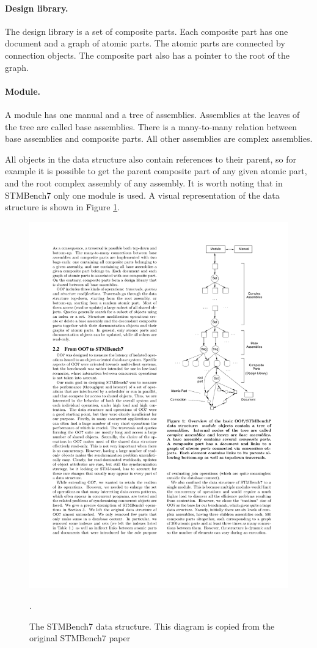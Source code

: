 \documentclass[12pt,a4paper,oneside,openright]{report}
\newcommand{\mycaption}[2]{\caption[#1]{#1 #2}}
\begin{document}
\paragraph{Design library.} The design library is a set of composite
parts. Each composite part has one document and a graph of atomic
parts. The atomic parts are connected by connection objects. The
composite part also has a pointer to the root of the graph.

\paragraph{Module.} A module has one manual and a tree of
assemblies. Assemblies at the leaves of the tree are called base
assemblies. There is a many-to-many relation between base assemblies
and composite parts. All other assemblies are complex assemblies.

All objects in the data structure also contain references to their
parent, so for example it is possible to get the parent composite part
of any given atomic part, and the root complex assembly of any
assembly. It is worth noting that in STMBench7 only one module is
used. A visual representation of the data structure is shown in Figure
\ref{fig:stmbench7}.

\begin{figure}[h]
  \centering \includegraphics{stmbench7.pdf} \mycaption{The STMBench7
    data structure.}{This diagram is copied from the original
    STMBench7 paper~\cite{STMBench7}}.
  \label{fig:stmbench7}
\end{figure}
\end{document}
